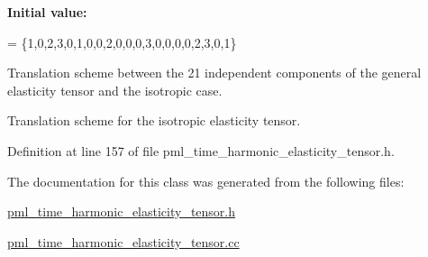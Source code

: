 {\bfseries Initial value\+:}
\begin{DoxyCode}
=
 \{1,0,2,3,0,1,0,0,2,0,0,0,3,0,0,0,0,2,3,0,1\}
\end{DoxyCode}


Translation scheme between the 21 independent components of the general elasticity tensor and the isotropic case. 

Translation scheme for the isotropic elasticity tensor. 

Definition at line 157 of file pml\+\_\+time\+\_\+harmonic\+\_\+elasticity\+\_\+tensor.\+h.



The documentation for this class was generated from the following files\+:\begin{DoxyCompactItemize}
\item 
\hyperlink{pml__time__harmonic__elasticity__tensor_8h}{pml\+\_\+time\+\_\+harmonic\+\_\+elasticity\+\_\+tensor.\+h}\item 
\hyperlink{pml__time__harmonic__elasticity__tensor_8cc}{pml\+\_\+time\+\_\+harmonic\+\_\+elasticity\+\_\+tensor.\+cc}\end{DoxyCompactItemize}
